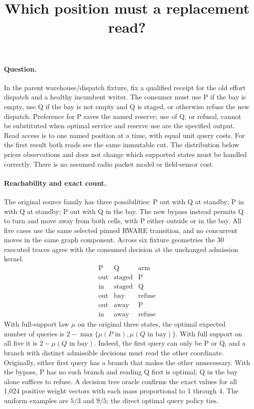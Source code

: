 \documentclass{article}
\title{Which position must a replacement read?}
\author{}
\date{}
\begin{document}
\maketitle
\paragraph{Question.}
In the parent warehouse/dispatch fixture, fix a qualified receipt
for the old effort dispatch and a healthy incumbent writer. The
consumer must use P if the bay is empty, use Q if the bay is not
empty and Q is staged, or otherwise refuse the new dispatch.
Preference for P saves the named reserve; use of Q, or refusal,
cannot be substituted when optimal service and reserve use are the
specified output. Read access is to one named position at a time, with
equal unit query costs. For the first result both reads see the same
immutable cut. The distribution below prices observations and does
not change which supported states must be handled correctly. There is
no assumed radio packet model or field-sensor cost.

\paragraph{Reachability and exact count.}
The original source family has three possibilities: P out with Q
at standby; P in with Q at standby; P out with Q in the bay.
The new bypass instead permits Q to turn and move away from both
cells, with P either outside or in the bay. All five cases use the
same selected pinned RWARE transition, and no concurrent moves in
the same graph component. Across six fixture geometries the 30
executed traces agree with the consumed decision at the
unchanged admission kernel.
\[
\begin{array}{c|c|c}
\text{P}&\text{Q}&\text{arm}\\\hline
\text{out}&\text{staged}&\text{P}\\
\text{in}&\text{staged}&\text{Q}\\
\text{out}&\text{bay}&\text{refuse}\\
\text{out}&\text{away}&\text{P}\\
\text{in}&\text{away}&\text{refuse}
\end{array}
\]
With full-support law \(\mu\) on the original three states, the
optimal expected number of queries is
\(2-\max\{\mu(P\text{ in}),\mu(Q\text{ in bay})\}\).
With full support on all five it is
\(2-\mu(Q\text{ in bay})\).
Indeed, the first query can only be P or Q, and a branch with
distinct admissible decisions must read the other coordinate.
Originally, either first query has a branch that makes the
other unnecessary. With the bypass, P has no such branch and
reading Q first is optimal; Q in the bay alone suffices to refuse.
A decision tree oracle confirms the exact values for all 1,024
positive weight vectors with each mass proportional to 1 through 4.
The uniform examples are \(5/3\) and \(9/5\); the direct optimal
query policy ties.
\end{document}
